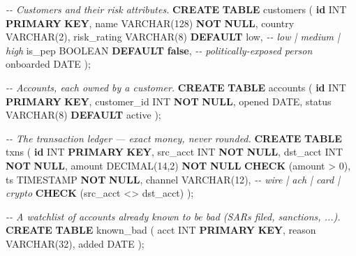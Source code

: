 \documentclass[
  11pt,
  openany]{book}
\newenvironment{Shaded}{}{}
\newcommand{\CommentTok}[1]{\textcolor[rgb]{0.38,0.63,0.69}{\textit{#1}}}
\newcommand{\DataTypeTok}[1]{\textcolor[rgb]{0.56,0.13,0.00}{#1}}
\newcommand{\DecValTok}[1]{\textcolor[rgb]{0.25,0.63,0.44}{#1}}
\newcommand{\KeywordTok}[1]{\textcolor[rgb]{0.00,0.44,0.13}{\textbf{#1}}}
\newcommand{\NormalTok}[1]{#1}
\newcommand{\OperatorTok}[1]{\textcolor[rgb]{0.40,0.40,0.40}{#1}}
\newcommand{\StringTok}[1]{\textcolor[rgb]{0.25,0.44,0.63}{#1}}
\begin{document}
\begin{Shaded}
\begin{Highlighting}[]
\CommentTok{{-}{-} Customers and their risk attributes.}
\KeywordTok{CREATE} \KeywordTok{TABLE}\NormalTok{ customers (}
  \KeywordTok{id}          \DataTypeTok{INT} \KeywordTok{PRIMARY} \KeywordTok{KEY}\NormalTok{,}
\NormalTok{  name        }\DataTypeTok{VARCHAR}\NormalTok{(}\DecValTok{128}\NormalTok{) }\KeywordTok{NOT} \KeywordTok{NULL}\NormalTok{,}
\NormalTok{  country     }\DataTypeTok{VARCHAR}\NormalTok{(}\DecValTok{2}\NormalTok{),}
\NormalTok{  risk\_rating }\DataTypeTok{VARCHAR}\NormalTok{(}\DecValTok{8}\NormalTok{) }\KeywordTok{DEFAULT} \StringTok{\textquotesingle{}low\textquotesingle{}}\NormalTok{,     }\CommentTok{{-}{-} low | medium | high}
\NormalTok{  is\_pep      }\DataTypeTok{BOOLEAN} \KeywordTok{DEFAULT} \KeywordTok{false}\NormalTok{,        }\CommentTok{{-}{-} politically{-}exposed person}
\NormalTok{  onboarded   }\DataTypeTok{DATE}
\NormalTok{);}

\CommentTok{{-}{-} Accounts, each owned by a customer.}
\KeywordTok{CREATE} \KeywordTok{TABLE}\NormalTok{ accounts (}
  \KeywordTok{id}          \DataTypeTok{INT} \KeywordTok{PRIMARY} \KeywordTok{KEY}\NormalTok{,}
\NormalTok{  customer\_id }\DataTypeTok{INT} \KeywordTok{NOT} \KeywordTok{NULL}\NormalTok{,}
\NormalTok{  opened      }\DataTypeTok{DATE}\NormalTok{,}
\NormalTok{  status      }\DataTypeTok{VARCHAR}\NormalTok{(}\DecValTok{8}\NormalTok{) }\KeywordTok{DEFAULT} \StringTok{\textquotesingle{}active\textquotesingle{}}
\NormalTok{);}

\CommentTok{{-}{-} The transaction ledger — exact money, never rounded.}
\KeywordTok{CREATE} \KeywordTok{TABLE}\NormalTok{ txns (}
  \KeywordTok{id}       \DataTypeTok{INT} \KeywordTok{PRIMARY} \KeywordTok{KEY}\NormalTok{,}
\NormalTok{  src\_acct }\DataTypeTok{INT} \KeywordTok{NOT} \KeywordTok{NULL}\NormalTok{,}
\NormalTok{  dst\_acct }\DataTypeTok{INT} \KeywordTok{NOT} \KeywordTok{NULL}\NormalTok{,}
\NormalTok{  amount   }\DataTypeTok{DECIMAL}\NormalTok{(}\DecValTok{14}\NormalTok{,}\DecValTok{2}\NormalTok{) }\KeywordTok{NOT} \KeywordTok{NULL} \KeywordTok{CHECK}\NormalTok{ (amount }\OperatorTok{\textgreater{}} \DecValTok{0}\NormalTok{),}
\NormalTok{  ts       }\DataTypeTok{TIMESTAMP} \KeywordTok{NOT} \KeywordTok{NULL}\NormalTok{,}
\NormalTok{  channel  }\DataTypeTok{VARCHAR}\NormalTok{(}\DecValTok{12}\NormalTok{),                     }\CommentTok{{-}{-} wire | ach | card | crypto}
  \KeywordTok{CHECK}\NormalTok{ (src\_acct }\OperatorTok{\textless{}\textgreater{}}\NormalTok{ dst\_acct)}
\NormalTok{);}

\CommentTok{{-}{-} A watchlist of accounts already known to be bad (SARs filed, sanctions, ...).}
\KeywordTok{CREATE} \KeywordTok{TABLE}\NormalTok{ known\_bad (}
\NormalTok{  acct     }\DataTypeTok{INT} \KeywordTok{PRIMARY} \KeywordTok{KEY}\NormalTok{,}
\NormalTok{  reason   }\DataTypeTok{VARCHAR}\NormalTok{(}\DecValTok{32}\NormalTok{),}
\NormalTok{  added    }\DataTypeTok{DATE}
\NormalTok{);}
\end{Highlighting}
\end{Shaded}
\end{document}
